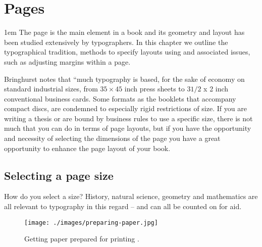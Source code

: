 \makeatletter
\newenvironment{adjustmargins}[2]{%
 \begin{list}{}{%
 \topsep\z@%
 \listparindent\parindent%
 \parsep\parskip%
 \checkoddpage
 \ifoddpage %
 \@ifmtarg{#1}{\setlength{\leftmargin}{\z@}}%
 {\setlength{\leftmargin}{#1}}%
 \@ifmtarg{#2}{\setlength{\rightmargin}{\z@}}%
 {\setlength{\rightmargin}{#2}}%
 \else %
 \@ifmtarg{#2}{\setlength{\leftmargin}{\z@}}%
 {\setlength{\leftmargin}{#2}}%
 \@ifmtarg{#1}{\setlength{\rightmargin}{\z@}}%
 {\setlength{\rightmargin}{#1}}%
\fi
}
\item[]}{\end{list}}

\makeatother
\chapter{Pages}

\parindent1em
The page is the main element in a book and its geometry and layout has been studied extensively by typographers. In this chapter we outline the typographical tradition, methods to specify layouts using \latex and associated issues, such as adjusting margins within a page.

Bringhurst notes that ``much typography is based, for the sake of economy on standard industrial sizes, from $35\times45$ inch press sheets to $3 1/2$ x 2 inch conventional business cards. Some formats as the booklets that accompany compact discs, are condemned to especially rigid restrictions of size.  If you are writing a thesis or are bound by business rules to use a specific size, there is not much that you can do in terms of page layouts, but if you have the opportunity and necessity of selecting the dimensions of the page you have a great opportunity to enhance the page layout of your book.

\section{Selecting a page size}

How do you select a size? History, natural science, geometry and mathematics
are all relevant to typography in this regard -- and can all be counted on for aid.

\begin{figure}[ht]
\centering
\texttt{[image: ./images/preparing-paper.jpg]}
\caption{Getting paper prepared for printing \citep{moxon}.}
\end{figure}

